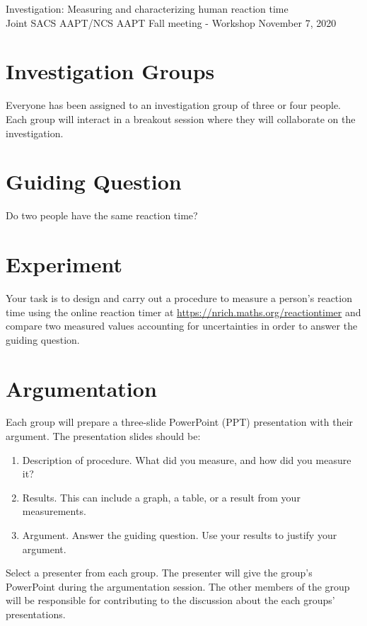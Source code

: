 \documentclass[11pt, oneside]{article}
\begin{document}
\begin{center}
  {\Large Investigation: Measuring and characterizing human reaction time}\\
  Joint SACS AAPT/NCS AAPT Fall meeting - Workshop
  November 7, 2020
\end{center}

\section*{Investigation Groups}
Everyone has been assigned to an investigation group of three or four people. Each group will
interact in a breakout session where they will collaborate on the investigation.

\section*{Guiding Question}
Do two people have the same reaction time?

\section*{Experiment}
Your task is to design and carry out a procedure to measure a person's reaction time using the
online reaction timer at
\href{https://nrich.maths.org/reactiontimer}{https://nrich.maths.org/reactiontimer} and compare
two measured values accounting for uncertainties in order to answer the guiding question.

\section*{Argumentation}
Each group will prepare a three-slide PowerPoint (PPT) presentation with their argument. The
presentation slides should be:
\begin{enumerate}
  \item Description of procedure.  What did you measure, and how did you measure it?
  \item Results. This can include a graph, a table, or a result from your measurements.
  \item Argument. Answer the guiding question. Use your results to justify your argument.
\end{enumerate}
Select a presenter from each group. The presenter will give the group's PowerPoint during the
argumentation session. The other members of the group will be responsible for contributing to
the discussion about the each groups' presentations.
\end{document}
